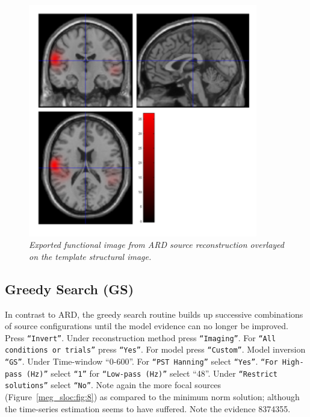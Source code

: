\begin{figure}
\begin{center}
\includegraphics[width=100mm]{meg_sloc/slide7}
\caption{\em Exported functional image from ARD source reconstruction overlayed on the template structural image.\label{meg_sloc:fig:7}}
\end{center}
\end{figure}


\subsection{Greedy Search (GS)}
In contrast to ARD, the greedy search routine builds up successive combinations of source configurations until the model evidence can no longer be improved.
Press \texttt{``Invert''}. Under reconstruction method press \texttt{``Imaging''}. For \texttt{``All conditions or trials''} press \texttt{``Yes''}. For model press \texttt{``Custom''}. Model inversion \texttt{``GS''}. Under Time-window ``0-600''. For \texttt{``PST Hanning''} select \texttt{``Yes''}. \texttt{``For High-pass (Hz)''} select \texttt{``1''} for \texttt{``Low-pass (Hz)''} select ``48''. Under \texttt{``Restrict solutions''} select \texttt{``No''}.  Note again the more focal sources (Figure~\ref{meg_sloc:fig:8}) as compared to the minimum norm solution; although the time-series estimation seems to have suffered. Note the evidence 8374355.

